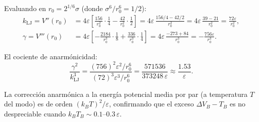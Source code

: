 \documentclass[11pt, a4paper]{article}
\begin{document}
Evaluando en $r_0 = 2^{1/6}\sigma$ (donde $\sigma^6/r_0^6 = 1/2$):
\begin{align}
  k_\text{LJ} = V''(r_0) &= 4\varepsilon\left[\frac{156}{r_0^2}\cdot\frac{1}{4}
    - \frac{42}{r_0^2}\cdot\frac{1}{2}\right]
    = 4\varepsilon\,\frac{156/4 - 42/2}{r_0^2}
    = 4\varepsilon\,\frac{39 - 21}{r_0^2}
    = \frac{72\varepsilon}{r_0^2}, \\[6pt]
  \gamma = V'''(r_0) &= 4\varepsilon\left[-\frac{2184}{r_0^3}\cdot\frac{1}{8}
    + \frac{336}{r_0^3}\cdot\frac{1}{4}\right]
    = 4\varepsilon\,\frac{-273 + 84}{r_0^3}
    = -\frac{756\varepsilon}{r_0^3}.
\end{align}

El cociente de anarmónicidad:
\begin{equation}
  \frac{\gamma^2}{k_\text{LJ}^3}
  = \frac{(756)^2\varepsilon^2/r_0^6}{(72)^3\varepsilon^3/r_0^6}
  = \frac{571536}{373248\,\varepsilon}
  \approx \frac{1.53}{\varepsilon}.
\end{equation}

La corrección anarmónica a la energía potencial media por par (a temperatura
$T$ del modo) es de orden $(k_BT)^2/\varepsilon$, confirmando que el exceso
$\Delta V_B - T_B$ es no despreciable cuando $k_BT_B \sim 0.1\text{--}0.3\,\varepsilon$.
\end{document}
